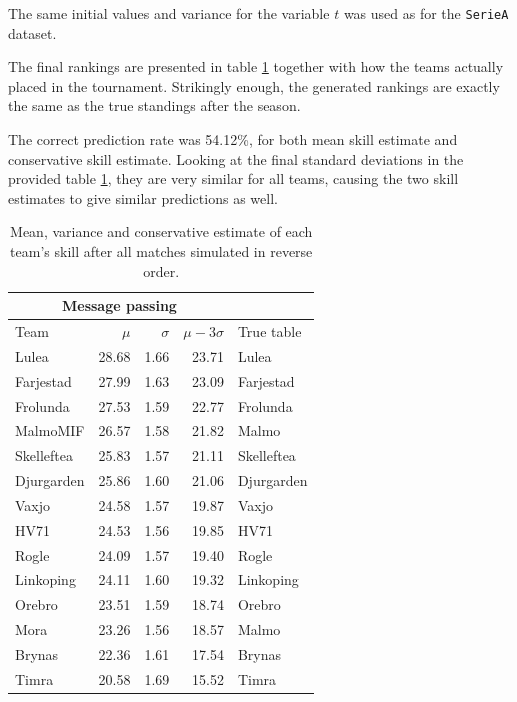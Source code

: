 \documentclass{article}
\begin{document}
	The same initial values and variance for the variable $t$ was used as for the \texttt{SerieA} dataset.
	
	The final rankings are presented in table \ref{tab:shl} together with how the teams actually placed in the tournament. Strikingly enough, the generated rankings are exactly the same as the true standings after the season.
	
	The correct prediction rate was 54.12\%, for both mean skill estimate and conservative skill estimate. Looking at the final standard deviations in the provided table \ref{tab:shl}, they are very similar for all teams, causing the two skill estimates to give similar predictions as well.
	
	\begin{table}[!h]
		\caption{Mean, variance and conservative estimate of each team's skill after all matches simulated in reverse order.}
		\label{tab:shl}
		\centering
		\footnotesize
		\begin{tabular}{lrrr|l}
			\toprule
			\multicolumn{4}{c}{Message passing} &  \\
			\midrule
			Team     		& $ \mu $ & $ \sigma $ & $ \mu - 3\sigma $ & True table\\ \midrule
			Lulea	       	& 28.68  &  1.66  &  23.71 & Lulea 		\\
			Farjestad   	& 27.99  &  1.63  &  23.09 & Farjestad	\\
			Frolunda    	& 27.53  &  1.59  &  22.77 & Frolunda	\\
			MalmoMIF       	& 26.57  &  1.58  &  21.82 & Malmo		\\
			Skelleftea  	& 25.83  &  1.57  &  21.11 & Skelleftea	\\
			Djurgarden  	& 25.86  &  1.60  &  21.06 & Djurgarden	\\
			Vaxjo       	& 24.58  &  1.57  &  19.87 & Vaxjo		\\
			HV71      	 	& 24.53  &  1.56  &  19.85 & HV71		\\
			Rogle       	& 24.09  &  1.57  &  19.40 & Rogle		\\
			Linkoping   	& 24.11  &  1.60  &  19.32 & Linkoping	\\
			Orebro      	& 23.51  &  1.59  &  18.74 & Orebro		\\
			Mora        	& 23.26  &  1.56  &  18.57 & Malmo		\\
			Brynas      	& 22.36  &  1.61  &  17.54 & Brynas		\\
			Timra       	& 20.58  &  1.69  &  15.52 & Timra		\\\bottomrule
		\end{tabular}
	\end{table}
\end{document}

